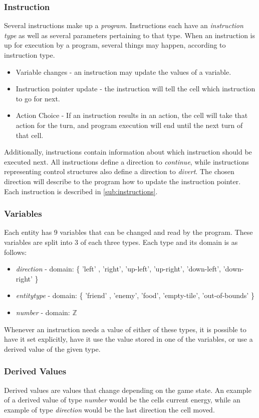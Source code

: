 \subsubsection{Instruction}
Several instructions make up a \emph{program}. Instructions each have an \emph{instruction type} as well as several parameters pertaining to that type. When an instruction is up for execution by a program, several things may happen, according to instruction type.
\begin{itemize}
\item Variable changes - an instruction may update the values of a variable.
\item Instruction pointer update - the instruction will tell the cell which instruction to go for next.
\item Action Choice - If an instruction results in an action, the cell will take that action for the turn, and program execution will end until the next turn of that cell.
\end{itemize}
Additionally, instructions contain information about which instruction should be executed next. All instructions define a direction to \emph{continue}, while instructions representing control structures also define a direction to \emph{divert}. The chosen direction will describe to the program how to update the instruction pointer. Each instruction is described in \autoref{sub:instructions}.

\subsubsection{Variables}
Each entity has 9 variables that can be changed and read by the program. These variables are split into 3 of each three types. Each type and its domain is as follows:
\begin{itemize}
\item \emph{direction} - domain: \{ 'left' , 'right', 'up-left', 'up-right', 'down-left', 'down-right' \}
\item \emph{entitytype} - domain: \{ 'friend' , 'enemy', 'food', 'empty-tile', 'out-of-bounds' \}
\item \emph{number} - domain: $\mathbb{Z}$
\end{itemize}
Whenever an instruction needs a value of either of these types, it is possible to have it set explicitly, have it use the value stored in one of the variables, or use a derived value of the given type.

\subsubsection{Derived Values}
Derived values are values that change depending on the game state. An example of a derived value of type \emph{number} would be the cells current energy, while an example of type \emph{direction} would be the last direction the cell moved.

